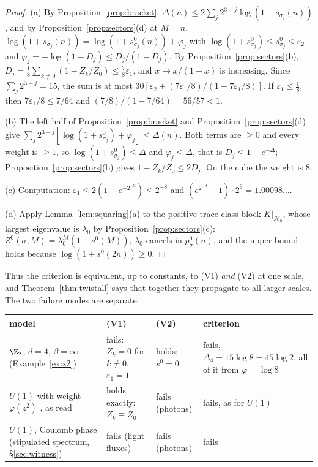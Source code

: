 \begin{proof}
(a) By Proposition~\ref{prop:bracket}, $\Delta(n)\le2\sum_j2^{3-j}\log(1+s_{\sigma_j}(n))$, and by Proposition~\ref{prop:sectors}(d) at $M=n$, $\log(1+s_{\sigma_j}(n))=\log(1+s^0_{\sigma_j}(n))+\varphi_j$ with $\log(1+s^0_{\sigma_j})\le s^0_{\sigma_j}\le\varepsilon_2$ and $\varphi_j=-\log(1-D_j)\le D_j/(1-D_j)$. By Proposition~\ref{prop:sectors}(b), $D_j=\frac18\sum_{k\ne0}(1-Z_k/Z_0)\le\frac78\varepsilon_1$, and $x\mapsto x/(1-x)$ is increasing. Since $\sum_j2^{3-j}=15$, the sum is at most $30[\varepsilon_2+(7\varepsilon_1/8)/(1-7\varepsilon_1/8)]$. If $\varepsilon_1\le\frac18$, then $7\varepsilon_1/8\le7/64$ and $(7/8)/(1-7/64)=56/57<1$.

(b) The left half of Proposition~\ref{prop:bracket} and Proposition~\ref{prop:sectors}(d) give $\sum_j2^{3-j}[\log(1+s^0_{\sigma_j})+\varphi_j]\le\Delta(n)$. Both terms are $\ge0$ and every weight is $\ge1$, so $\log(1+s^0_{\sigma_j})\le\Delta$ and $\varphi_j\le\Delta$, that is $D_j\le1-e^{-\Delta}$; Proposition~\ref{prop:sectors}(b) gives $1-Z_k/Z_0\le2D_j$. On the cube the weight is $8$.

(c) Computation: $\varepsilon_1\le2(1-e^{-2^{-9}})\le2^{-8}$ and $(e^{2^{-9}}-1)\cdot2^9=1.00098\ldots$.

(d) Apply Lemma~\ref{lem:squaring}(a) to the positive trace-class block $K|_{\mathcal H_0}$, whose largest eigenvalue is $\lambda_0$ by Proposition~\ref{prop:sectors}(c): $Z^0(\sigma,M)=\lambda_0^M(1+s^0(M))$, $\lambda_0$ cancels in $p^0_\sigma(n)$, and the upper bound holds because $\log(1+s^0(2n))\ge0$.
\end{proof}
Thus the criterion is equivalent, up to constants, to (V1) \emph{and} (V2) at one scale, and Theorem~\ref{thm:twistall} says that together they propagate to all larger scales. The two failure modes are separate:
\begin{center}\footnotesize
\begin{tabular}{@{}>{\raggedright\arraybackslash}p{}>{\raggedright\arraybackslash}p{}>{\raggedright\arraybackslash}p{}>{\raggedright\arraybackslash}p{}@{}}
\toprule
model & (V1) & (V2) & criterion\\
\midrule
$\Z_2$, $d=4$, $\beta=\infty$ (Example~\ref{ex:z2}) & fails: $Z_k=0$ for $k\ne0$, $\varepsilon_1=1$ & holds: $s^0=0$ & fails, $\Delta_4=15\log8=45\log2$, all of it from $\varphi=\log8$\\
$U(1)$ with weight $\varphi(z^2)$ \cite[Prop.~11.29]{BB26v5}, as read & holds exactly: $Z_k\equiv Z_0$ & fails (photons) & fails, as for $U(1)$\\
$U(1)$, Coulomb phase (stipulated spectrum, \S\ref{sec:witness}) & fails (light fluxes) & fails (photons) & fails\\
\bottomrule
\end{tabular}
\end{center}
